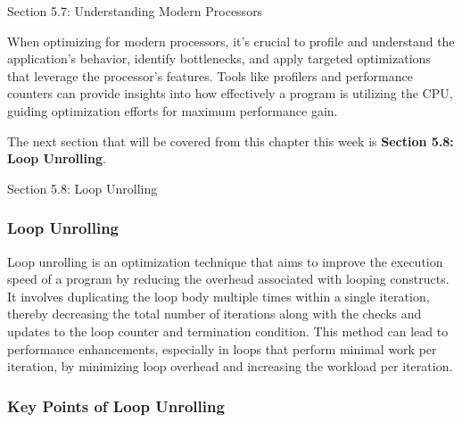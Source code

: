 \begin{notes}{Section 5.7: Understanding Modern Processors}
    \begin{highlight}
        When optimizing for modern processors, it's crucial to profile and understand the application's behavior, identify bottlenecks, and apply targeted optimizations that leverage the processor's 
        features. Tools like profilers and performance counters can provide insights into how effectively a program is utilizing the CPU, guiding optimization efforts for maximum performance gain.
    \end{highlight}    
\end{notes}

The next section that will be covered from this chapter this week is \textbf{Section 5.8: Loop Unrolling}.

\begin{notes}{Section 5.8: Loop Unrolling}
    \subsubsection*{Loop Unrolling}

    Loop unrolling is an optimization technique that aims to improve the execution speed of a program by reducing the overhead associated with looping constructs. It involves duplicating the loop body 
    multiple times within a single iteration, thereby decreasing the total number of iterations along with the checks and updates to the loop counter and termination condition. This method can lead to 
    performance enhancements, especially in loops that perform minimal work per iteration, by minimizing loop overhead and increasing the workload per iteration. \vspace*{1em}
    
    \subsubsection*{Key Points of Loop Unrolling}
    

\end{notes}
